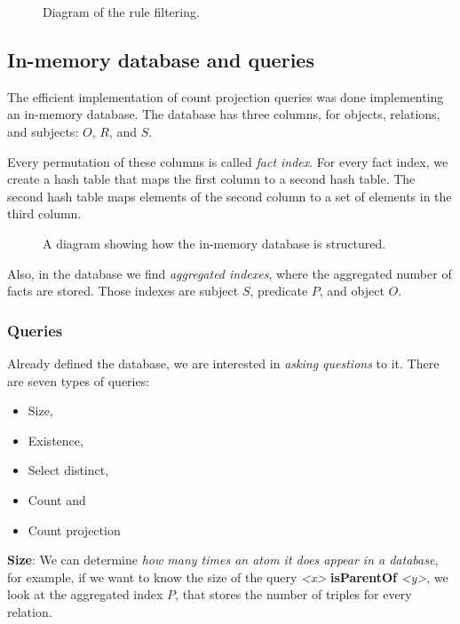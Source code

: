 \documentclass{article}
\newcommand{\triple}[3]{{\itshape\textless#1\textgreater} {\bfseries#2} {\itshape\textless#3\textgreater}}
\begin{document}
\begin{figure}[H]
\centering
\resizebox{!}{0.50\textheight}{%
    
}
\caption{Diagram of the rule filtering.}
\label{fig:accepted_for_output}
\end{figure}


\subsection{In-memory database and queries}
\label{ssec:in_memory_database}

The efficient implementation of count projection queries was done implementing
an in-memory database. The database has three columns, for objects, relations,
and subjects: $O$, $R$, and $S$.

Every permutation of these columns is called \textit{fact index}. For every
fact index, we create a hash table that maps the first column to a second hash
table. The second hash table maps elements of the second column to a set of
elements in the third column.

\begin{figure}[H]
\centering
    
\caption{A diagram showing how the in-memory database is structured.}
\label{fig:db}
\end{figure}

Also, in the database we find \textit{aggregated indexes}, where the aggregated
number of facts are stored. Those indexes are subject $S$, predicate $P$, and object $O$.

\subsubsection{Queries}
\label{sssec:queries}

Already defined the database, we are interested in \textit{asking questions} to
it. There are seven types of queries:

\begin{itemize}
    \item Size,
    \item Existence,
    \item Select distinct,
    \item Count and
    \item Count projection
\end{itemize}

\noindent \textbf{Size}: We can determine \textit{how many times an
atom it does appear in a database}, for example, if we want to know the size of
the query \triple{x}{isParentOf}{y}, we look at the aggregated index $P$, that
stores the number of triples for every relation.
\end{document}
